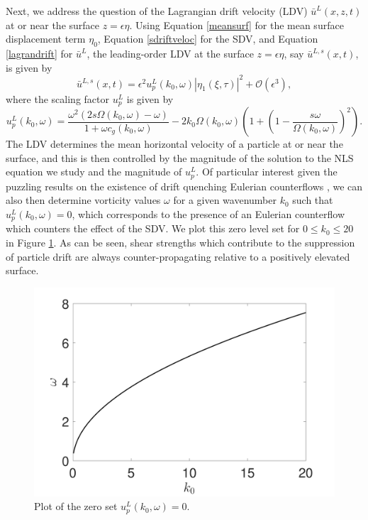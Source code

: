 \documentclass{JFM_Style/jfm}
\begin{document}
Next, we address the question of the Lagrangian drift velocity (LDV) $\bar{u}^{L}(x,z,t)$ at or near the surface $z=\epsilon \eta$.  Using Equation \eqref{meansurf} for the mean surface displacement term $\eta_{0}$, Equation \eqref{sdriftveloc} for the SDV, and Equation \eqref{lagrandrift} for $\bar{u}^{L}$, the leading-order LDV at the surface $z=\epsilon \eta$, say $\bar{u}^{L,s}(x,t)$, is given by
\[
\bar{u}^{L,s}(x,t) = \epsilon^{2} u^{L}_{p}(k_{0},\omega)|\eta_{1}(\xi,\tau)|^{2} + \mathcal{O}(\epsilon^{3}),
\]
where the scaling factor $u^{L}_{p}$ is given by 
\[
u^{L}_{p}(k_{0},\omega) =  \frac{ \omega^{2}(2s\Omega(k_{0},\omega) - \omega)}{1+\omega c_{g}(k_{0},\omega)} - 2k_{0}\Omega(k_{0},\omega)\left(1 + \left(1 - \frac{s\omega}{\Omega(k_{0},\omega)} \right)^{2}\right). 
\]
The LDV determines the mean horizontal velocity of a particle at or near the surface, and this is then controlled by the magnitude of the solution to the NLS equation we study and the magnitude of $u^{L}_{p}$.  Of particular interest given the puzzling results on the existence of drift quenching Eulerian counterflows \cite{monismith,smith}, we can also then determine vorticity values $\omega$ for a given wavenumber $k_{0}$ such that $u^{L}_{p}(k_{0},\omega) =0$, which corresponds to the presence of an Eulerian counterflow which counters the effect of the SDV.  We plot this zero level set for $0\leq k_{0}\leq 20$ in Figure \ref{fig:zerodriftk0}.  As can be seen, shear strengths which contribute to the suppression of particle drift are always counter-propagating relative to a positively elevated surface.  
\begin{figure}
\centering
\includegraphics[width=.55\textwidth]{zero_return_shear}
\caption{\small Plot of the zero set $u^{L}_{p}(k_{0},\omega)=0$.}
\label{fig:zerodriftk0}
\end{figure}
\end{document}
